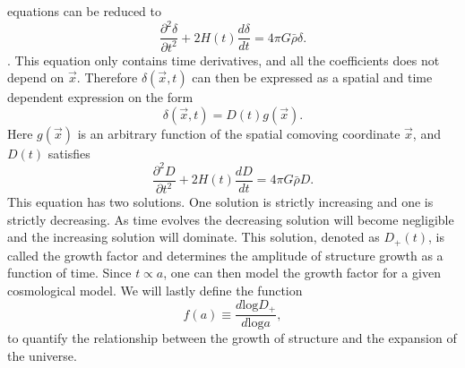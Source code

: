 equations can be reduced to 
\begin{equation}
    \frac{\partial^2 \delta}{\partial t^2} + 2H(t) \frac{d \delta}{dt}=4\pi G\bar{\rho}\delta.
\end{equation}
\cite[p.~345]{schneider2006extragalactic}. This equation only contains time derivatives, and all the coefficients does not
depend on $\vec{x}$. Therefore $\delta(\vec{x}, t)$ can then be expressed as a spatial and time
dependent expression on the form 
\begin{equation}
    \delta(\vec{x}, t) = D(t)g(\vec{x}).
\end{equation}
Here $g(\vec{x})$ is an arbitrary function of the spatial comoving coordinate
$\vec{x}$, and $D(t)$ satisfies
\begin{equation}\label{eq:growthfacD}
    \frac{\partial^2 D}{\partial t^2} + 2H(t) \frac{d D}{dt}=4\pi G\bar{\rho}D.
\end{equation}
This equation has two solutions. One solution is strictly increasing and one is
strictly decreasing. As time evolves the decreasing solution will become negligible
and the increasing solution will dominate. This solution, denoted as $D_+(t)$,
is called the growth factor and determines the amplitude of structure growth as
a function of time. Since $t\propto a$, one can then model the growth factor for
a given cosmological model. We will lastly define the function
\begin{equation}\label{eq:growthfac}
    f(a) \equiv \frac{d\mathrm{ log} D_+}{d\mathrm{log} a},
\end{equation}
to quantify the relationship between the growth of structure and the expansion
of the universe.
